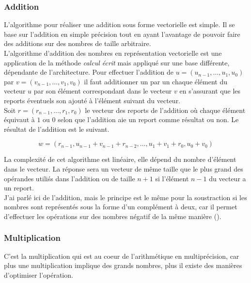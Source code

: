 \documentclass[letterpaper]{article}
\begin{document}
\subsubsection{Addition}

L'algorithme pour réaliser une addition sous forme vectorielle est simple.
Il se base sur l'addition en simple précision tout en ayant l'avantage de
pouvoir faire des additions sur des nombres de taille arbitraire. \\

L'algorithme d'addition des nombres en représentation vectorielle est une
application de la méthode \emph{calcul écrit} mais appliqué sur une base
différente, dépendante de l'architecture. Pour effectuer l'addition de $u =
(u_{n - 1}, \dots, u_1, u_0)$ par $v = (v_{n - 1}, \dots, v_1, v_0)$ il faut
additionner un par un chaque élément du vecteur $u$ par son élément
correspondant dans le vecteur $v$ en s'assurant que les reports éventuels son
ajouté à l'élément suivant du vecteur.\\

Soit $r = (r_{n - 1}, \dots, r_{1}, r_{0})$ le vecteur des reports de
l'addition où chaque élément équivaut à $1$ ou $0$ selon que l'addition aie un
report comme résultat ou non. Le résultat de l'addition est le suivant.

$$w = (r_{n - 1}, u_{n - 1} + v_{n - 1} + r_{n - 2}, \dots, u_1 + v_1 + r_0, u_0 + v_0)$$

La complexité de cet algorithme est linéaire, elle  dépend du nombre d'élément
dans le vecteur.
La réponse sera un vecteur de même taille que le plus grand des opérandes
utiliśs dans l'addition ou de taille $n + 1$ si l'élément $n - 1$ du vecteur
a un report.\\

J'ai parlé ici de l'addition, mais le principe est le même pour la soustraction
si les nombres sont représentés sous la forme d'un complément à deux, car il
permet d'effectuer les opérations sur des nombres négatif de la même
manière (\cite{wikicomplementtwo}).

\subsubsection{Multiplication}

C'est la multiplication qui est au coeur de l'arithmétique en multiprécision,
car plus une multiplication implique des grands nombres, plus il existe des
manières d'optimiser l'opération.\\
\end{document}
